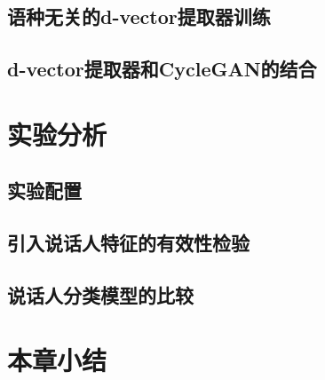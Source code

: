 \subsection{语种无关的d-vector提取器训练}
\subsection{d-vector提取器和CycleGAN的结合}

\section{实验分析}
\subsection{实验配置}
\subsection{引入说话人特征的有效性检验}
\subsection{说话人分类模型的比较}


\section{本章小结}